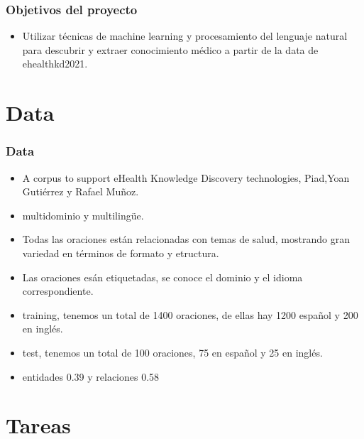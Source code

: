 \documentclass[
11pt, %
%
aspectratio=169, %
]{beamer}
\begin{document}
	\begin{frame}
		\frametitle{Objetivos del proyecto}
		\begin{itemize}
			\item Utilizar técnicas de machine learning y procesamiento del lenguaje natural para descubrir y extraer conocimiento médico a partir de la data de ehealthkd2021.
			
			
		\end{itemize}
	 	
	
	
	\end{frame}

     \section{Data}
     \begin{frame}
     	\frametitle{Data}
     	
     	\begin{itemize}
     		\item  A corpus to support eHealth Knowledge Discovery technologies, Piad,Yoan Gutiérrez y Rafael Muñoz.
     		\item multidominio y multilingüe.
     		\item Todas las oraciones est\'an relacionadas con temas de salud, mostrando gran variedad en t\'erminos de formato y etructura.
     		\item Las oraciones es\'an etiquetadas, se conoce el dominio y el idioma correspondiente.
     		\item training, tenemos un total de 1400 oraciones, de ellas hay 1200 español y 200 en inglés.
     		\item test, tenemos un total de 100 oraciones, 75 en español y 25 en inglés.
     		\item entidades 0.39 y relaciones 0.58
     		
     		
     	\end{itemize}
     	
     	 
     	
     
     	
     \end{frame}
     
     \section{Tareas}
     
\end{document}

